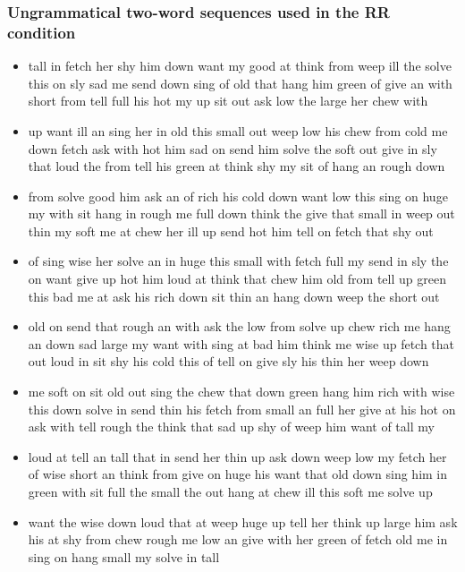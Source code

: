 \documentclass[10pt,letterpaper]{article}
\begin{document}
\begin{flushleft}
\begin{itemize}
\end{itemize}


\subsubsection{Ungrammatical two-word sequences used in the RR condition}

\begin{itemize}
  \item tall
in
fetch
her
shy
him
down
want
my
good
at
think
from
weep
ill
the
solve
this
on
sly
sad
me
send
down
sing
of
old
that
hang
him
green
of
give
an
with
short
from
tell
full
his
hot
my
up
sit
out
ask
low
the
large
her
chew
with
  \item up
want
ill
an
sing
her
in
old
this
small
out
weep
low
his
chew
from
cold
me
down
fetch
ask
with
hot
him
sad
on
send
him
solve
the
soft
out
give
in
sly
that
loud
the
from
tell
his
green
at
think
shy
my
sit
of
hang
an
rough
down
  \item from
solve
good
him
ask
an
of
rich
his
cold
down
want
low
this
sing
on
huge
my
with
sit
hang
in
rough
me
full
down
think
the
give
that
small
in
weep
out
thin
my
soft
me
at
chew
her
ill
up
send
hot
him
tell
on
fetch
that
shy
out
  \item of
sing
wise
her
solve
an
in
huge
this
small
with
fetch
full
my
send
in
sly
the
on
want
give
up
hot
him
loud
at
think
that
chew
him
old
from
tell
up
green
this
bad
me
at
ask
his
rich
down
sit
thin
an
hang
down
weep
the
short
out
  \item old
on
send
that
rough
an
with
ask
the
low
from
solve
up
chew
rich
me
hang
an
down
sad
large
my
want
with
sing
at
bad
him
think
me
wise
up
fetch
that
out
loud
in
sit
shy
his
cold
this
of
tell
on
give
sly
his
thin
her
weep
down
  \item me
soft
on
sit
old
out
sing
the
chew
that
down
green
hang
him
rich
with
wise
this
down
solve
in
send
thin
his
fetch
from
small
an
full
her
give
at
his
hot
on
ask
with
tell
rough
the
think
that
sad
up
shy
of
weep
him
want
of
tall
my
  \item loud
at
tell
an
tall
that
in
send
her
thin
up
ask
down
weep
low
my
fetch
her
of
wise
short
an
think
from
give
on
huge
his
want
that
old
down
sing
him
in
green
with
sit
full
the
small
the
out
hang
at
chew
ill
this
soft
me
solve
up
  \item want
the
wise
down
loud
that
at
weep
huge
up
tell
her
think
up
large
him
ask
his
at
shy
from
chew
rough
me
low
an
give
with
her
green
of
fetch
old
me
in
sing
on
hang
small
my
solve
in
tall

\end{itemize}
\end{flushleft}
\end{document}
